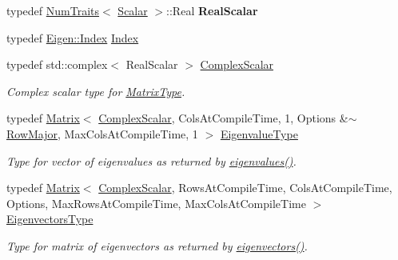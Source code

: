 \begin{DoxyCompactItemize}
\mbox{\label{group___eigenvalues___module_aad50fbc086d07e69015426ffd11f7e44}} 
typedef \hyperlink{group___core___module_struct_eigen_1_1_num_traits}{Num\+Traits}$<$ \hyperlink{group___eigenvalues___module_a017d49fe0d59874b70a2fcf35e5aa373}{Scalar} $>$\+::Real {\bfseries Real\+Scalar}
\item 
typedef \hyperlink{namespace_eigen_a62e77e0933482dafde8fe197d9a2cfde}{Eigen\+::\+Index} \hyperlink{group___eigenvalues___module_a5bff6a6bc0efac67d52c60c2c3deb9ee}{Index}
\item 
typedef std\+::complex$<$ Real\+Scalar $>$ \hyperlink{group___eigenvalues___module_a4d0b2a773357d0a6ec98e026f04002ed}{Complex\+Scalar}
\begin{DoxyCompactList}\small\item\em Complex scalar type for \hyperlink{group___eigenvalues___module_a83acd180404ddaac8a678fa65a6b632b}{Matrix\+Type}. \end{DoxyCompactList}\item 
typedef \hyperlink{group___core___module_class_eigen_1_1_matrix}{Matrix}$<$ \hyperlink{group___eigenvalues___module_a4d0b2a773357d0a6ec98e026f04002ed}{Complex\+Scalar}, Cols\+At\+Compile\+Time, 1, Options \&$\sim$\hyperlink{group__enums_ggaacded1a18ae58b0f554751f6cdf9eb13acfcde9cd8677c5f7caf6bd603666aae3}{Row\+Major}, Max\+Cols\+At\+Compile\+Time, 1 $>$ \hyperlink{group___eigenvalues___module_adc446bcb60572758fa64515f2825db62}{Eigenvalue\+Type}
\begin{DoxyCompactList}\small\item\em Type for vector of eigenvalues as returned by \hyperlink{group___eigenvalues___module_a114189009e42f5e03372a7a3dfa33b97}{eigenvalues()}. \end{DoxyCompactList}\item 
typedef \hyperlink{group___core___module_class_eigen_1_1_matrix}{Matrix}$<$ \hyperlink{group___eigenvalues___module_a4d0b2a773357d0a6ec98e026f04002ed}{Complex\+Scalar}, Rows\+At\+Compile\+Time, Cols\+At\+Compile\+Time, Options, Max\+Rows\+At\+Compile\+Time, Max\+Cols\+At\+Compile\+Time $>$ \hyperlink{group___eigenvalues___module_aa140354e2f7d5ce34c6488c39e19f2c2}{Eigenvectors\+Type}
\begin{DoxyCompactList}\small\item\em Type for matrix of eigenvectors as returned by \hyperlink{group___eigenvalues___module_a66288022802172e3ee059283b26201d7}{eigenvectors()}. \end{DoxyCompactList}\item 

\end{DoxyCompactItemize}
